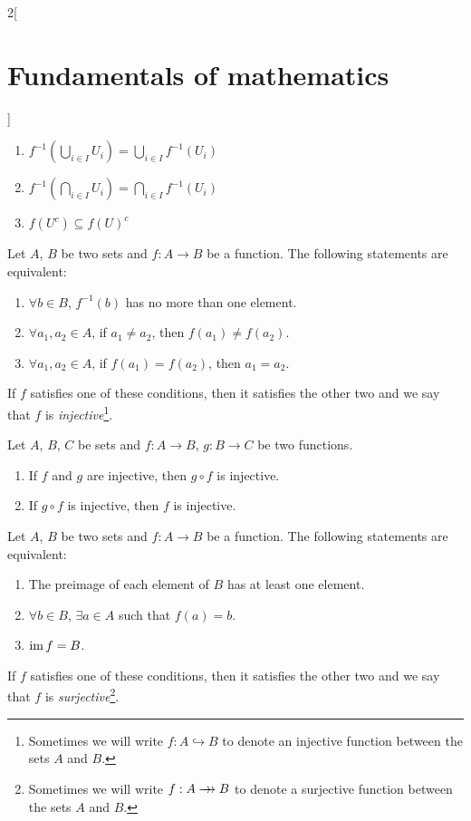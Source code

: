 \documentclass[../../../main.tex]{subfiles}
\begin{document}
\begin{multicols}{2}[\section{Fundamentals of mathematics}]
\begin{proposition}
\begin{enumerate}
      \item $f^{-1}\left(\bigcup_{i\in I}U_i\right)=\bigcup_{i\in I}f^{-1}(U_i)$
      \item $f^{-1}\left(\bigcap_{i\in I}U_i\right)=\bigcap_{i\in I}f^{-1}(U_i)$
      \item $f(U^c)\subseteq f(U)^c$
    \end{enumerate}
  \end{proposition}
  \begin{definition}
    Let $A$, $B$ be two sets and $f:A\rightarrow B$ be a function. The following statements are equivalent:
    \begin{enumerate}
      \item $\forall b\in B$, $f^{-1}(b)$ has no more than one element.
      \item $\forall a_1,a_2\in A$, if $a_1\ne a_2$, then $f(a_1)\ne f(a_2)$.
      \item $\forall a_1,a_2\in A$, if $f(a_1)= f(a_2)$, then $a_1=a_2$.
    \end{enumerate}
    If $f$ satisfies one of these conditions, then it satisfies the other two and we say that $f$ is \emph{injective}\footnote{Sometimes we will write $f:A\hookrightarrow B$ to denote an injective function between the sets $A$ and $B$.}.
  \end{definition}
  \begin{proposition}
    Let $A$, $B$, $C$ be sets and $f:A\rightarrow B$, $g:B\rightarrow C$ be two functions.
    \begin{enumerate}
      \item If $f$ and $g$ are injective, then $g\circ f$ is injective.
      \item If $g\circ f$ is injective, then $f$ is injective.
    \end{enumerate}
  \end{proposition}
  \begin{definition}
    Let $A$, $B$ be two sets and $f:A\rightarrow B$ be a function. The following statements are equivalent:
    \begin{enumerate}
      \item The preimage of each element of $B$ has at least one element.
      \item $\forall b\in B$, $\exists a\in A$ such that $f(a)=b$.
      \item $\operatorname{im} f=B$.
    \end{enumerate}
    If $f$ satisfies one of these conditions, then it satisfies the other two and we say that $f$ is \emph{surjective}\footnote{Sometimes we will write $f:A\rrightarrow B$ to denote a surjective function between the sets $A$ and $B$.}.

\end{definition}
\end{multicols}
\end{document}
